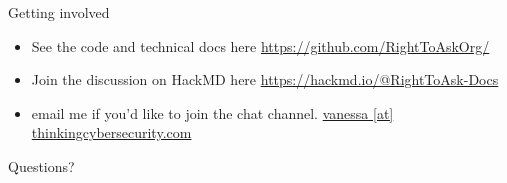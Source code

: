 \documentclass[10pt,xcolor=svgnames,169]{beamer} %
\begin{document}
\begin{frame}{Getting involved}
	
	\begin{itemize}
		\item See the code and technical docs here
	\url{https://github.com/RightToAskOrg/}
	\item Join the discussion on HackMD here
	\url{https://hackmd.io/@RightToAsk-Docs}
	\item email me if you'd like to join the chat channel.
	\url{vanessa [at] thinkingcybersecurity.com}
	\end{itemize}
\end{frame}

	{ %
		\begin{frame}[standout]
			Questions? 
		\end{frame}
	}
	
	
\end{document}
